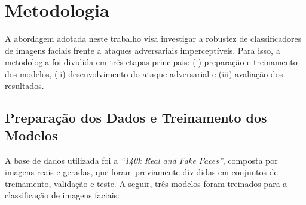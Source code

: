 \documentclass[12pt]{article}
\begin{document}
\section{Metodologia}

A abordagem adotada neste trabalho visa investigar a robustez de
classificadores de imagens faciais frente a ataques adversariais
imperceptíveis. Para isso, a metodologia foi dividida em três etapas
principais: (i) preparação e treinamento dos modelos, (ii) desenvolvimento do
ataque adversarial e (iii) avaliação dos resultados.

\subsection{Preparação dos Dados e Treinamento dos Modelos}

A base de dados utilizada foi a \textit{``140k Real and Fake Faces''}, composta
por imagens reais e geradas, que foram previamente divididas em conjuntos de
treinamento, validação e teste. A seguir, três modelos foram treinados para a
classificação de imagens faciais:
\end{document}
